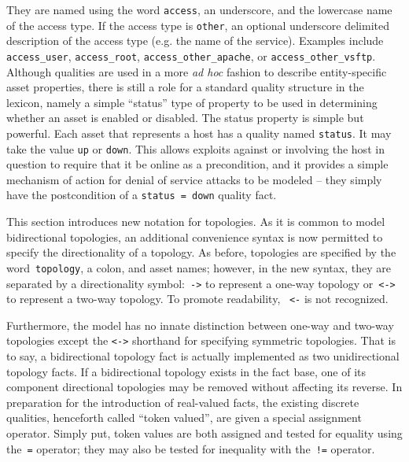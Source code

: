 They are named using the word \texttt{access}, an underscore, 
and the lowercase name of the access type. If the access type is \texttt{other},
an optional underscore delimited description of the access type (e.g. the name 
of the service). Examples include
\texttt{access\_user}, \texttt{access\_root}, \texttt{access\_other\_apache}, or
\texttt{access\_other\_vsftp}.
Although qualities are used in a more \emph{ad hoc} fashion to describe entity-specific
asset properties, there is still a role for a standard quality structure in the
lexicon, namely a simple ``status'' type of property to be used in determining
whether an asset is enabled or disabled.
The status property is simple but powerful. Each asset that represents a host has a
quality named \texttt{status}. It may take the value \texttt{up} or \texttt{down}.
This allows exploits against or involving the host in question to require that it
be online as a precondition, and it provides a simple mechanism of action for
denial of service attacks to be modeled -- they simply have the postcondition of
a \texttt{status = down} quality fact.

This section introduces new notation for topologies. As it
is common to model bidirectional topologies, an additional convenience syntax
is now permitted to specify the directionality of a topology. As before, 
topologies are specified by the word~\texttt{topology}, a colon, 
and asset names; however, in the new syntax,
they are separated by a directionality symbol:~\texttt{->} to 
represent a one-way topology
or~\texttt{<->} to represent a two-way topology. To promote readability,
~\texttt{<-} is not recognized.

Furthermore, the model has no innate distinction between one-way and two-way
topologies except the \texttt{<->} shorthand for specifying symmetric topologies.
That is to say, a bidirectional topology fact is actually implemented as
two unidirectional topology facts. If a bidirectional
topology exists in the fact base, one of its component directional topologies may
be removed without affecting its reverse.
In preparation for the introduction of real-valued facts, the existing discrete
qualities, henceforth called ``token valued'', are given a special
assignment operator. Simply put, token values are both assigned and tested
for equality using the~\texttt{=} operator; they may also be tested 
for inequality with the~\texttt{!=} operator.

